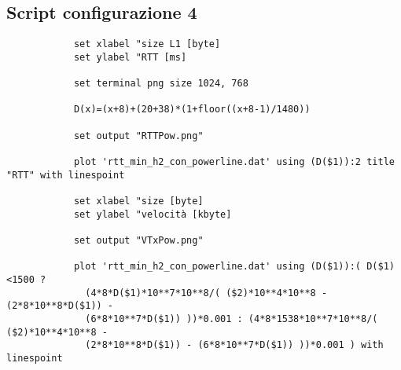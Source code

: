 \documentclass[../lab2.tex]{subfiles}
\begin{document}
\begin{appendices}
        \section{Script configurazione 4}
        \begin{verbatim}
            set xlabel "size L1 [byte]
            set ylabel "RTT [ms]

            set terminal png size 1024, 768

            D(x)=(x+8)+(20+38)*(1+floor((x+8-1)/1480))

            set output "RTTPow.png"

            plot 'rtt_min_h2_con_powerline.dat' using (D($1)):2 title "RTT" with linespoint

            set xlabel "size [byte]
            set ylabel "velocità [kbyte]

            set output "VTxPow.png"

            plot 'rtt_min_h2_con_powerline.dat' using (D($1)):( D($1)<1500 ? 
              (4*8*D($1)*10**7*10**8/( ($2)*10**4*10**8 - (2*8*10**8*D($1)) - 
              (6*8*10**7*D($1)) ))*0.001 : (4*8*1538*10**7*10**8/( ($2)*10**4*10**8 - 
              (2*8*10**8*D($1)) - (6*8*10**7*D($1)) ))*0.001 ) with linespoint
        \end{verbatim}

  \end{appendices}
\end{document}
